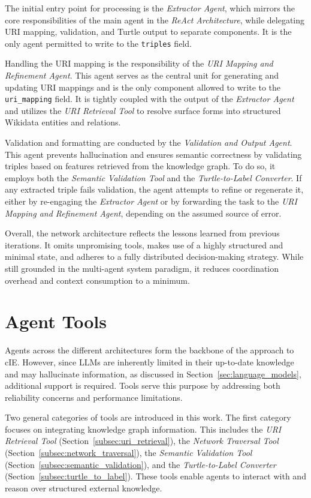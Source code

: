 \documentclass[a4paper,oneside,bibliography=totoc]{scrbook}
\begin{document}
The initial entry point for processing is the \textit{Extractor Agent}, which mirrors the core responsibilities of the main agent in the \textit{ReAct Architecture}, while delegating URI mapping, validation, and Turtle output to separate components. It is the only agent permitted to write to the \texttt{triples} field.

Handling the URI mapping is the responsibility of the \textit{URI Mapping and Refinement Agent}. This agent serves as the central unit for generating and updating URI mappings and is the only component allowed to write to the \texttt{uri\_mapping} field. It is tightly coupled with the output of the \textit{Extractor Agent} and utilizes the \textit{URI Retrieval Tool} to resolve surface forms into structured Wikidata entities and relations.

Validation and formatting are conducted by the \textit{Validation and Output Agent}. This agent prevents hallucination and ensures semantic correctness by validating triples based on features retrieved from the knowledge graph. To do so, it employs both the \textit{Semantic Validation Tool} and the \textit{Turtle-to-Label Converter}. If any extracted triple fails validation, the agent attempts to refine or regenerate it, either by re-engaging the \textit{Extractor Agent} or by forwarding the task to the \textit{URI Mapping and Refinement Agent}, depending on the assumed source of error.

Overall, the network architecture reflects the lessons learned from previous iterations. It omits unpromising tools, makes use of a highly structured and minimal state, and adheres to a fully distributed decision-making strategy. While still grounded in the multi-agent system paradigm, it reduces coordination overhead and context consumption to a minimum.

\section{Agent Tools}
\label{sec:agent_tools}

Agents across the different architectures form the backbone of the approach to \ac{cIE}. However, since \acp{LLM} are inherently limited in their up-to-date knowledge and may hallucinate information, as discussed in Section~\ref{sec:language_models}, additional support is required. Tools serve this purpose by addressing both reliability concerns and performance limitations.

Two general categories of tools are introduced in this work. The first category focuses on integrating knowledge graph information. This includes the \textit{URI Retrieval Tool} (Section~\ref{subsec:uri_retrieval}), the \textit{Network Traversal Tool} (Section~\ref{subsec:network_traversal}), the \textit{Semantic Validation Tool} (Section~\ref{subsec:semantic_validation}), and the \textit{Turtle-to-Label Converter} (Section~\ref{subsec:turtle_to_label}). These tools enable agents to interact with and reason over structured external knowledge.
\end{document}
